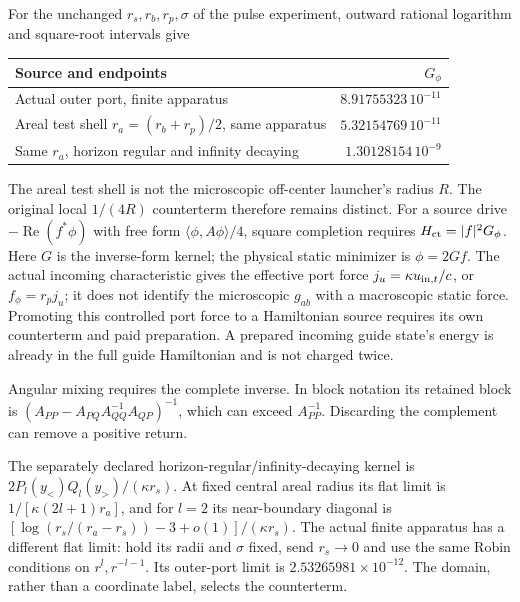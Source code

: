 \documentclass[10pt,twocolumn,letterpaper]{article}
\begin{document}
For the unchanged $r_s,r_b,r_p,\sigma$ of the pulse experiment,
outward rational logarithm and square-root intervals give
\begin{center}
\small
\begin{tabular}{p{}r}
\hline
Source and endpoints & $G_\phi$\\\hline
Actual outer port, finite apparatus
 & $8.91755323\,10^{-11}$\\
Areal test shell $r_a=(r_b+r_p)/2$, same apparatus
 & $5.32154769\,10^{-11}$\\
Same $r_a$, horizon regular and infinity decaying
 & $1.30128154\,10^{-9}$\\\hline
\end{tabular}
\end{center}
The areal test shell is not the microscopic off-center launcher's radius
$R$. The original local $1/(4R)$ counterterm therefore remains distinct.
For a source drive $-\operatorname{Re}(f^*\phi)$ with free form
$\langle\phi,A\phi\rangle/4$, square completion requires
$H_{\rm ct}=|f|^2G_\phi$. Here $G$ is the inverse-form kernel; the physical static minimizer is $\phi=2Gf$. The actual incoming characteristic gives the
effective port force $j_u=\kappa u_{{\rm in},t}/c$, or
$f_\phi=r_pj_u$; it does not identify the microscopic $g_{ab}$ with
a macroscopic static force. Promoting this controlled port force to a
Hamiltonian source requires its own counterterm and paid preparation.
A prepared incoming guide state's energy is already in the full guide
Hamiltonian and is not charged twice.

Angular mixing requires the complete inverse. In block notation its
retained block is
$(A_{PP}-A_{PQ}A_{QQ}^{-1}A_{QP})^{-1}$, which can exceed
$A_{PP}^{-1}$. Discarding the complement can remove a positive return.

The separately declared horizon-regular/infinity-decaying kernel is
$2P_l(y_<)Q_l(y_>)/(\kappa r_s)$. At fixed central areal radius its flat
limit is $1/[\kappa(2l+1)r_a]$, and for $l=2$ its near-boundary diagonal
is $[\log(r_s/(r_a-r_s))-3+o(1)]/(\kappa r_s)$.
The actual finite apparatus has a different flat limit: hold its radii and
$\sigma$ fixed, send $r_s\to0$ and use the same Robin conditions on
$r^l,r^{-l-1}$. Its outer-port limit is
$2.53265981\times10^{-12}$. The domain, rather than a coordinate label,
selects the counterterm.
\end{document}
